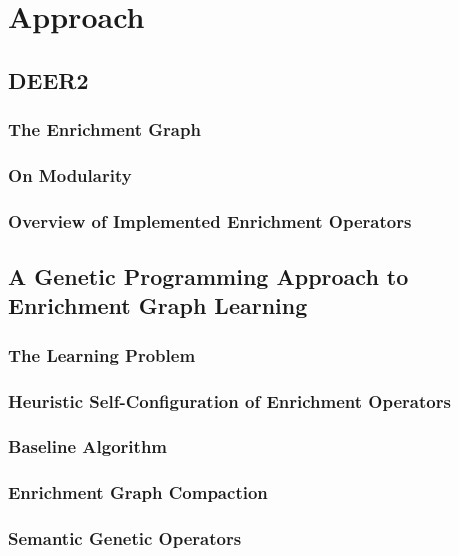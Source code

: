 \chapter{Approach}
\label{ch:approach}

\section{\ac{DEER2}}
\label{sec:deer2}

\subsection{The Enrichment Graph}
\label{ssec:enrichmentgraph}

\subsection{On Modularity}
\label{ssec:modularity}

\subsection{Overview of Implemented Enrichment Operators}
\label{ssec:enrichmentgraph}

\section{A Genetic Programming Approach to Enrichment Graph Learning}
\label{sec:gpapproach}

\subsection{The Learning Problem}
\label{ssec:learningproblem}

\subsection{Heuristic Self-Configuration of Enrichment Operators}
\label{ssec:selfconfig}

\subsection{Baseline Algorithm}
\label{ssec:baseline}

\subsection{Enrichment Graph Compaction}
\label{ssec:compaction}

\subsection{Semantic Genetic Operators}
\label{ssec:sgoapproach}
